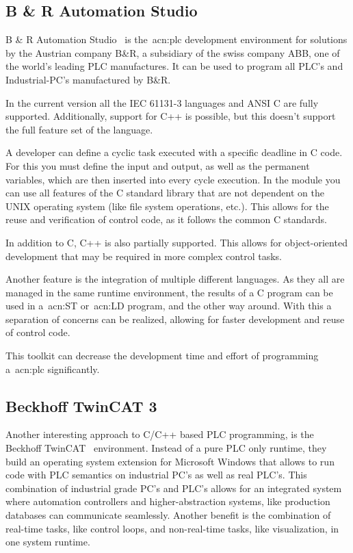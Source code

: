 \subsection{B \& R Automation Studio}
B \& R Automation Studio~\cite{b-r_automation:2020} is the~\acrshort{acn:plc} development environment for solutions by the Austrian company B\&R, a subsidiary of the swiss company ABB, one of the world's leading PLC manufactures.
It can be used to program all PLC's and Industrial-PC's manufactured by B\&R.

In the current version all the IEC 61131-3 languages and ANSI C are fully supported.
Additionally, support for C++ is possible, but this doesn't support the full feature set of the language.

A developer can define a cyclic task executed with a specific deadline in C code.
For this you must define the input and output, as well as the permanent variables, which are then inserted into every cycle execution.
In the module you can use all features of the C standard library that are not dependent on the UNIX operating system (like file system operations, etc.).
This allows for the reuse and verification of control code, as it follows the common C standards.

In addition to C, C++ is also partially supported.
This allows for object-oriented development that may be required in more complex control tasks.

Another feature is the integration of multiple different languages.
As they all are managed in the same runtime environment, the results of a C program can be used in a~\acrfull{acn:ST} or~\acrfull{acn:LD} program, and the other way around.
With this a separation of concerns can be realized, allowing for faster development and reuse of control code.

This toolkit can decrease the development time and effort of programming a~\acrshort{acn:plc} significantly.

\subsection{Beckhoff TwinCAT 3}

Another interesting approach to C/C++ based PLC programming, is the Beckhoff TwinCAT~\cite{Beckhoff:2020:2} environment.
Instead of a pure PLC only runtime, they build an operating system extension for Microsoft Windows that allows to run code with PLC semantics on industrial PC's as well as real PLC's.
This combination of industrial grade PC's and PLC's allows for an integrated system where automation controllers and higher-abstraction systems, like production databases can communicate seamlessly.
Another benefit is the combination of real-time tasks, like control loops, and non-real-time tasks, like visualization, in one system runtime.


